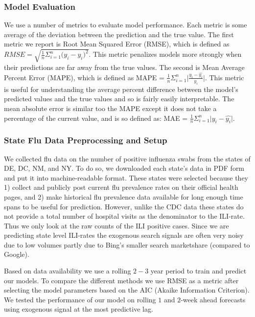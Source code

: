 \documentclass[12pt]{article}
\begin{document}
\subsubsection{Model Evaluation}

We use a number of metrics to evaluate model performance. Each metric is some average of the deviation between the prediction and the true value. The first metric we report is Root Mean Squared Error (RMSE), which is defined as $ RMSE = \sqrt{\frac{1}{n}\Sigma_{i=1}^{n}{\Big(y_i -\hat{y_i}\Big)^2}} $. This metric penalizes models more strongly when their predictions are far away from the true values. The second is Mean Average Percent Error (MAPE), which is defined as MAPE = $  \frac{1}{n} \Sigma_{i=1}^{n} \Big| \frac{ y_i -\hat{y_i} }{y_i}\Big|  $. This metric is useful for understanding the average percent difference between the model's predicted values and the true values and so is fairly easily interpretable. The mean absolute error is similar too the MAPE except it does not take a percentage of the current value, and is so defined as: MAE = $  \frac{1}{n} \Sigma_{i=1}^{n} \Big|  y_i -\hat{y_i} \Big|$. 

\subsubsection{State Flu Data Preprocessing and Setup}

We collected flu data on the number of positive influenza swabs from the states of DE, DC, NM, and NY. To do so, we downloaded each state's data in PDF form and put it into machine-readable format. These states were selected because they 1) collect and publicly post current flu prevalence rates on their official health pages, and 2) make historical flu prevalence data available for long enough time spans to be useful for prediction. However, unlike the CDC data these states do not provide a total number of hospital visits as the denominator to the ILI-rate. Thus we only look at the raw counts of the ILI positive cases. Since we are predicting state level ILI-rates the exogenous search signals are often very noisy due to low volumes partly due to Bing's smaller search marketshare (compared to Google). 

Based on data availability we use a rolling $2-3$ year period to train and predict our models. To compare the different methods we use RMSE as a metric after selecting the model parameters based on the AIC (Akaike Information Criterion). We tested the performance of our model on rolling $1$ and $2$-week ahead forecasts using exogenous signal at the most predictive lag.
\end{document}
